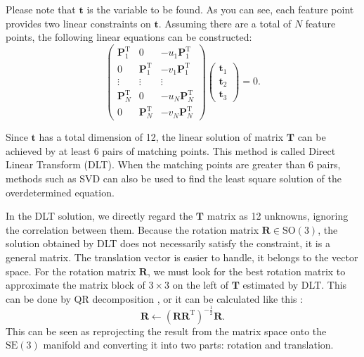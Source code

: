 Please note that $\mathbf{t}$ is the variable to be found. As you can see, each feature point provides two linear constraints on $\mathbf{t}$. Assuming there are a total of $N$ feature points, the following linear equations can be constructed:
\begin{equation}
\begin{pmatrix}
\mathbf{P}_{1}^{\mathrm{T}} & 0 & -u_{1}\mathbf{P}_{1}^{\mathrm{T}}	\\
0 & \mathbf{P}_{1}^{\mathrm{T}} & -v_{1}\mathbf{P}_{1}^{\mathrm{T}}	\\
\vdots & \vdots & \vdots			\\
\mathbf{P}_{N}^{\mathrm{T}} & 0 & -u_{N}\mathbf{P}_{N}^{\mathrm{T}} \\
0 & \mathbf{P}_{N}^{\mathrm{T}} & -v_{N}\mathbf{P}_{N}^{\mathrm{T}}
\end{pmatrix}
\begin{pmatrix}
\mathbf{t}_{1} \\ \mathbf{t}_{2} \\ \mathbf{t}_{3}
\end{pmatrix}
=0.
\end{equation}

Since $\mathbf{t}$ has a total dimension of 12, the linear solution of matrix $\mathbf{T}$ can be achieved by at least 6 pairs of matching points. This method is called Direct Linear Transform (DLT). When the matching points are greater than 6 pairs, methods such as SVD can also be used to find the least square solution of the overdetermined equation.

In the DLT solution, we directly regard the $\mathbf{T}$ matrix as 12 unknowns, ignoring the correlation between them. Because the rotation matrix $\mathbf{R} \in \mathrm{SO}(3)$, the solution obtained by DLT does not necessarily satisfy the constraint, it is a general matrix. The translation vector is easier to handle, it belongs to the vector space. For the rotation matrix $\mathbf{R}$, we must look for the best rotation matrix to approximate the matrix block of $3 \times 3$ on the left of $\mathbf{T}$ estimated by DLT. This can be done by QR decomposition \textsuperscript{\cite{Hartley2003, Chen1994}}, or it can be calculated like this \textsuperscript{\cite{Barfoot2016,Green1952}}:
\begin{equation}
\mathbf{R} \leftarrow {\left( {\mathbf{R}{\mathbf{R}^\mathrm{T}}} \right)^{ - \frac{1}{2}}} \mathbf{R}.
\end{equation}
This can be seen as reprojecting the result from the matrix space onto the $\mathrm{SE}(3)$ manifold and converting it into two parts: rotation and translation.

